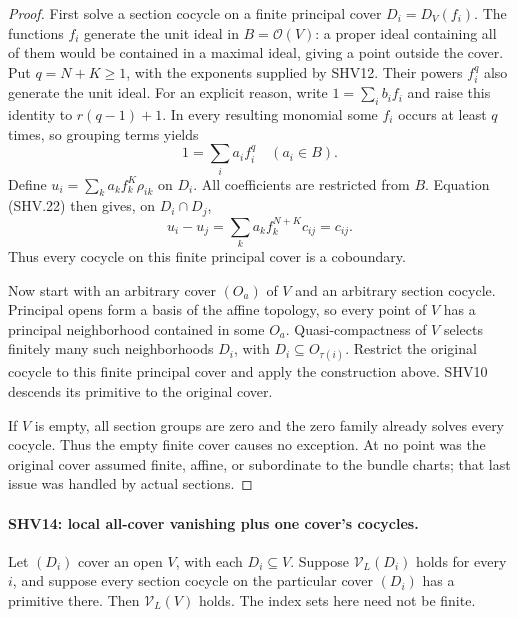 \documentclass[11pt,a4paper]{article}
\numberwithin{equation}{section}
\theoremstyle{remark}\newtheorem{remark}[theorem]{Remark}
\begin{document}
\begin{proof}
First solve a section cocycle on a finite principal cover
$D_i=D_V(f_i)$.  The functions $f_i$ generate the unit ideal
in $B=\mathcal O(V)$: a proper ideal containing all of them
would be contained in a maximal ideal, giving a point outside
the cover.  Put $q=N+K\ge1$, with the exponents supplied
by SHV12.  Their powers $f_i^q$ also generate the unit ideal.
For an explicit reason, write $1=\sum_i b_i f_i$ and raise
this identity to $r(q-1)+1$.  In every resulting monomial
some $f_i$ occurs at least $q$ times, so grouping terms yields
\[
                         1=\sum_i a_i f_i^q
                         \quad(a_i\in B).
                                                        \tag{SHV.24}
\]
Define
$u_i=\sum_k a_k f_k^K\rho_{ik}$ on $D_i$.
All coefficients are restricted from $B$.  Equation (SHV.22)
then gives, on $D_i\cap D_j$,
\[
 u_i-u_j
   =\sum_k a_k f_k^{N+K}c_{ij}
   =c_{ij}.
\]
Thus every cocycle on this finite principal cover is a coboundary.

Now start with an arbitrary cover $(O_a)$ of $V$ and an
arbitrary section cocycle.  Principal opens form a basis of the
affine topology, so every point of $V$ has a principal
neighborhood contained in some $O_a$.  Quasi-compactness of $V$
selects finitely many such neighborhoods $D_i$, with
$D_i\subseteq O_{\tau(i)}$.  Restrict the original cocycle to
this finite principal cover and apply the construction above.
SHV10 descends its primitive to the original cover.

If $V$ is empty, all section groups are zero and the zero
family already solves every cocycle.  Thus the empty finite
cover causes no exception.  At no point was the original
cover assumed finite, affine, or subordinate to the bundle
charts; that last issue was handled by actual sections.
\end{proof}

\paragraph{SHV14: local all-cover vanishing plus one cover's cocycles.}
\label{claim:SHV14}
Let $(D_i)$ cover an open $V$, with each $D_i\subseteq V$.
Suppose $\mathcal V_L(D_i)$ holds for every $i$, and suppose
every section cocycle on the particular cover $(D_i)$ has
a primitive there.  Then $\mathcal V_L(V)$ holds.  The index
sets here need not be finite.
\end{document}
